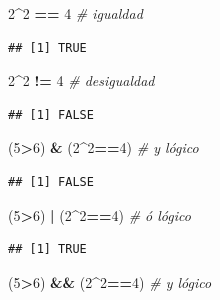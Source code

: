 \documentclass[
]{book}
\newenvironment{Shaded}{\begin{snugshade}}{\end{snugshade}}
\newcommand{\CommentTok}[1]{\textcolor[rgb]{0.56,0.35,0.01}{\textit{#1}}}
\newcommand{\DecValTok}[1]{\textcolor[rgb]{0.00,0.00,0.81}{#1}}
\newcommand{\NormalTok}[1]{#1}
\newcommand{\OperatorTok}[1]{\textcolor[rgb]{0.81,0.36,0.00}{\textbf{#1}}}
\newcommand{\StringTok}[1]{\textcolor[rgb]{0.31,0.60,0.02}{#1}}
\begin{document}
\begin{Shaded}
\begin{Highlighting}[]
\DecValTok{2}\OperatorTok{^}\DecValTok{2} \OperatorTok{==}\StringTok{ }\DecValTok{4} \CommentTok{# igualdad}
\end{Highlighting}
\end{Shaded}

\begin{verbatim}
## [1] TRUE
\end{verbatim}

\begin{Shaded}
\begin{Highlighting}[]
\DecValTok{2}\OperatorTok{^}\DecValTok{2} \OperatorTok{!=}\StringTok{ }\DecValTok{4} \CommentTok{# desigualdad}
\end{Highlighting}
\end{Shaded}

\begin{verbatim}
## [1] FALSE
\end{verbatim}

\begin{Shaded}
\begin{Highlighting}[]
\NormalTok{(}\DecValTok{5}\OperatorTok{>}\DecValTok{6}\NormalTok{) }\OperatorTok{&}\StringTok{ }\NormalTok{(}\DecValTok{2}\OperatorTok{^}\DecValTok{2}\OperatorTok{==}\DecValTok{4}\NormalTok{) }\CommentTok{# y lógico}
\end{Highlighting}
\end{Shaded}

\begin{verbatim}
## [1] FALSE
\end{verbatim}

\begin{Shaded}
\begin{Highlighting}[]
\NormalTok{(}\DecValTok{5}\OperatorTok{>}\DecValTok{6}\NormalTok{) }\OperatorTok{|}\StringTok{ }\NormalTok{(}\DecValTok{2}\OperatorTok{^}\DecValTok{2}\OperatorTok{==}\DecValTok{4}\NormalTok{) }\CommentTok{# ó lógico}
\end{Highlighting}
\end{Shaded}

\begin{verbatim}
## [1] TRUE
\end{verbatim}

\begin{Shaded}
\begin{Highlighting}[]
\NormalTok{(}\DecValTok{5}\OperatorTok{>}\DecValTok{6}\NormalTok{) }\OperatorTok{&&}\StringTok{ }\NormalTok{(}\DecValTok{2}\OperatorTok{^}\DecValTok{2}\OperatorTok{==}\DecValTok{4}\NormalTok{) }\CommentTok{# y lógico}
\end{Highlighting}
\end{Shaded}
\end{document}
